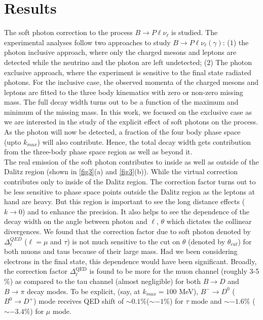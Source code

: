 \documentclass[a4paper,11pt]{article}
\begin{document}
    \section{Results}
	  \label{sec4}
	The soft photon correction to the process $B\rightarrow P \ell\nu_\ell$ is studied. The experimental analyses follow two 
	approaches to study $B\rightarrow P \ell\nu_\ell(\gamma)$: ($1$) the photon inclusive approach, where only the charged mesons and 
	leptons are detected while the neutrino and the photon are left undetected;
	($2$) The photon exclusive approach, where the experiment is sensitive to the final state radiated photons. For the inclusive case,
	the observed momenta of the charged mesons and leptons are fitted to the three body kinematics with zero or non-zero missing mass.
	The full decay width turns out to be a function of the maximum and minimum of the missing mass. In this work, we focused on 
	the exclusive case as we are interested in the study of the explicit effect of soft photons on the process. 
	As the photon will now be detected, a fraction of the four body phase space (upto $k_{max}$) will also contribute.
	Hence, the total decay width gets contribution from the three-body phase space region as well as beyond it. \\
	 The real emission of the soft photon contributes to inside as well as outside of the Dalitz region
	 (shown in \ref{fig3}(a) and \ref{fig3}(b)). While the virtual correction contributes only to inside of the Dalitz region.
The correction factor turns out to be less sensitive to phase space points outside the Dalitz region as the leptons at hand are heavy.
But this region is important to see the long distance effects ($k\to 0$) and to enhance the precision. It also helps to see the dependence of
the decay width on the angle between photon and $\ell$, $\theta$ which dictates the collinear divergences. We found that the correction factor due to soft
photon denoted by $\Delta_{\ell}^{QED}$ ($\ell=\mu$ and $\tau$) is not much sensitive to the cut on $\theta$
(denoted by $\theta_{cut}$) for both muons and taus because of their large mass. 
Had we been considering electrons in the final state, this dependence would have been significant. 
 Broadly, the correction factor $\Delta_{\ell}^{\text{QED}}$ is found to be more for the muon channel (roughly 3-5 \%) as compared to the tau channel (almost negligible) for both $B\to D$ and $B\to \pi$ decay modes. To be explicit, (say, at $k_{max}= 100$ MeV), $B^-\to D^0$ ($B^0\to D^+$) mode receives QED shift of $\sim 0.1\%$($\sim -1\%$) for $\tau$ mode and $\sim -1.6\%$ ($\sim -3.4\%$) for $\mu$ mode.\\ 
\end{document}
